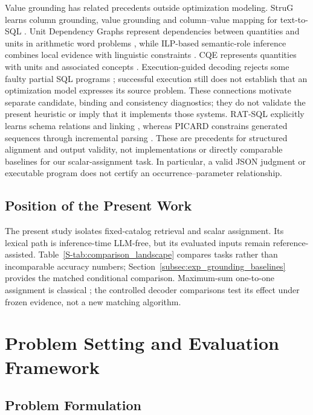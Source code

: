 \documentclass[pdflatex,sn-basic,Numbered]{sn-jnl}
\begin{document}
Value grounding has related precedents outside optimization modeling. StruG learns column grounding, value grounding and column--value mapping for text-to-SQL \cite{deng2021strug}. Unit Dependency Graphs represent dependencies between quantities and units in arithmetic word problems \cite{roy2017udg}, while ILP-based semantic-role inference combines local evidence with linguistic constraints \cite{punyakanok2004ilp}. CQE represents quantities with units and associated concepts \cite{almasian2023cqe}. Execution-guided decoding rejects some faulty partial SQL programs \cite{wang2018execution}; successful execution still does not establish that an optimization model expresses its source problem. These connections motivate separate candidate, binding and consistency diagnostics; they do not validate the present heuristic or imply that it implements those systems. RAT-SQL explicitly learns schema relations and linking \cite{wang2020ratsql}, whereas PICARD constrains generated sequences through incremental parsing \cite{scholak2021picard}. These are precedents for structured alignment and output validity, not implementations or directly comparable baselines for our scalar-assignment task. In particular, a valid JSON judgment or executable program does not certify an occurrence--parameter relationship.

\subsection{Position of the Present Work}
\label{subsec:rw_position}

The present study isolates fixed-catalog retrieval and scalar assignment. Its lexical path is inference-time LLM-free, but its evaluated inputs remain reference-assisted. Table~\ref{S-tab:comparison_landscape} compares tasks rather than incomparable accuracy numbers; Section~\ref{subsec:exp_grounding_baselines} provides the matched conditional comparison. Maximum-sum one-to-one assignment is classical \cite{kuhn1955assignment}; the controlled decoder comparisons test its effect under frozen evidence, not a new matching algorithm.



\section{Problem Setting and Evaluation Framework}
\label{sec:task}
\subsection{Problem Formulation}
\label{subsec:method_problem}
\end{document}
